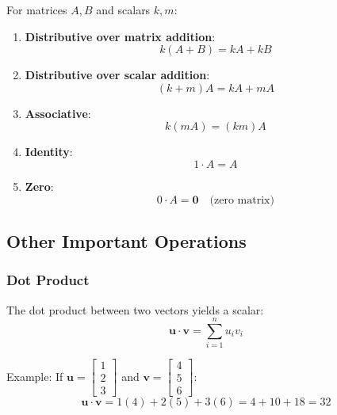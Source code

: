 \documentclass[11pt,a4paper]{article}
\begin{document}
For matrices $A, B$ and scalars $k, m$:

\begin{enumerate}
    \item \textbf{Distributive over matrix addition}:
    \begin{equation}
        k(A + B) = kA + kB
    \end{equation}
    
    \item \textbf{Distributive over scalar addition}:
    \begin{equation}
        (k + m)A = kA + mA
    \end{equation}
    
    \item \textbf{Associative}:
    \begin{equation}
        k(mA) = (km)A
    \end{equation}
    
    \item \textbf{Identity}:
    \begin{equation}
        1 \cdot A = A
    \end{equation}
    
    \item \textbf{Zero}:
    \begin{equation}
        0 \cdot A = \mathbf{0} \quad \text{(zero matrix)}
    \end{equation}
\end{enumerate}

\subsection{Other Important Operations}

\subsubsection{Dot Product}

The dot product between two vectors yields a scalar:
\begin{equation}
    \mathbf{u} \cdot \mathbf{v} = \sum_{i=1}^{n} u_i v_i
\end{equation}

Example: If $\mathbf{u} = \begin{bmatrix} 1 \\ 2 \\ 3 \end{bmatrix}$ and $\mathbf{v} = \begin{bmatrix} 4 \\ 5 \\ 6 \end{bmatrix}$:
\begin{equation}
    \mathbf{u} \cdot \mathbf{v} = 1(4) + 2(5) + 3(6) = 4 + 10 + 18 = 32
\end{equation}
\end{document}
